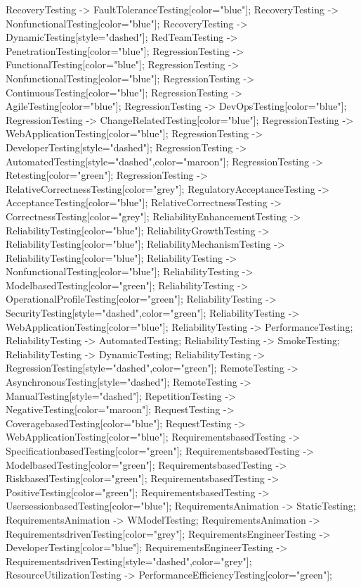 \documentclass{article}
\begin{document}
{RecoveryTesting -> FaultToleranceTesting[color="blue"];
RecoveryTesting -> NonfunctionalTesting[color="blue"];
RecoveryTesting -> DynamicTesting[style="dashed"];
RedTeamTesting -> PenetrationTesting[color="blue"];
RegressionTesting -> FunctionalTesting[color="blue"];
RegressionTesting -> NonfunctionalTesting[color="blue"];
RegressionTesting -> ContinuousTesting[color="blue"];
RegressionTesting -> AgileTesting[color="blue"];
RegressionTesting -> DevOpsTesting[color="blue"];
RegressionTesting -> ChangeRelatedTesting[color="blue"];
RegressionTesting -> WebApplicationTesting[color="blue"];
RegressionTesting -> DeveloperTesting[style="dashed"];
RegressionTesting -> AutomatedTesting[style="dashed",color="maroon"];
RegressionTesting -> Retesting[color="green"];
RegressionTesting -> RelativeCorrectnessTesting[color="grey"];
RegulatoryAcceptanceTesting -> AcceptanceTesting[color="blue"];
RelativeCorrectnessTesting -> CorrectnessTesting[color="grey"];
ReliabilityEnhancementTesting -> ReliabilityTesting[color="blue"];
ReliabilityGrowthTesting -> ReliabilityTesting[color="blue"];
ReliabilityMechanismTesting -> ReliabilityTesting[color="blue"];
ReliabilityTesting -> NonfunctionalTesting[color="blue"];
ReliabilityTesting -> ModelbasedTesting[color="green"];
ReliabilityTesting -> OperationalProfileTesting[color="green"];
ReliabilityTesting -> SecurityTesting[style="dashed",color="green"];
ReliabilityTesting -> WebApplicationTesting[color="blue"];
ReliabilityTesting -> PerformanceTesting;
ReliabilityTesting -> AutomatedTesting;
ReliabilityTesting -> SmokeTesting;
ReliabilityTesting -> DynamicTesting;
ReliabilityTesting -> RegressionTesting[style="dashed",color="green"];
RemoteTesting -> AsynchronousTesting[style="dashed"];
RemoteTesting -> ManualTesting[style="dashed"];
RepetitionTesting -> NegativeTesting[color="maroon"];
RequestTesting -> CoveragebasedTesting[color="blue"];
RequestTesting -> WebApplicationTesting[color="blue"];
RequirementsbasedTesting -> SpecificationbasedTesting[color="green"];
RequirementsbasedTesting -> ModelbasedTesting[color="green"];
RequirementsbasedTesting -> RiskbasedTesting[color="green"];
RequirementsbasedTesting -> PositiveTesting[color="green"];
RequirementsbasedTesting -> UsersessionbasedTesting[color="blue"];
RequirementsAnimation -> StaticTesting;
RequirementsAnimation -> WModelTesting;
RequirementsAnimation -> RequirementsdrivenTesting[color="grey"];
RequirementsEngineerTesting -> DeveloperTesting[color="blue"];
RequirementsEngineerTesting -> RequirementsdrivenTesting[style="dashed",color="grey"];
ResourceUtilizationTesting -> PerformanceEfficiencyTesting[color="green"];
}
\end{document}
